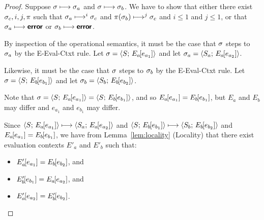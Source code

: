 \begin{proof}
  Suppose $\sigma \longmapsto \sigma_a$ and $\sigma \longmapsto \sigma_b$.
  We have to show that either there exist $\sigma_c, i, j, \pi$ such
  that $\sigma_a \longmapsto^i \sigma_c$ and $\pi(\sigma_b) \longmapsto^j
  \sigma_c$ and $i \leq 1$ and $j \leq 1$, or that $\sigma_a \longmapsto
  \textbf{\textsf{error}}$ or $\sigma_b \longmapsto \textbf{\textsf{error}}$.

  By inspection of the operational semantics, it must be the case that
  $\sigma$ steps to $\sigma_a$ by the {\sc E-Eval-Ctxt} rule.  Let
  $\sigma = \langle S;\, E_a\hspace{-1mm}\left[e_{a_1}\right] \rangle$ and let $\sigma_a =
  \langle S_a;\, E_a\hspace{-1mm}\left[e_{a_2}\right] \rangle$.

  Likewise, it must be the case that $\sigma$ steps to $\sigma_b$ by the
  {\sc E-Eval-Ctxt} rule.  Let $\sigma =
  \langle S;\, E_b\hspace{-1mm}\left[e_{b_1}\right] \rangle$ and let $\sigma_b =
  \langle S_b;\, E_b\hspace{-1mm}\left[e_{b_2}\right] \rangle$.

  Note that $\sigma = \langle S;\, E_a\hspace{-1mm}\left[e_{a_1}\right] \rangle =
  \langle S;\, E_b\hspace{-1mm}\left[e_{b_1}\right] \rangle$, and so
  $E_a\hspace{-1mm}\left[e_{a_1}\right] = E_b\hspace{-1mm}\left[e_{b_1}\right]$, but $E_a$ and
  $E_b$ may differ and $e_{a_1}$ and $e_{b_1}$ may differ.

  Since $\langle S;\, E_a\hspace{-1mm}\left[e_{a_1}\right] \rangle \longmapsto
  \langle S_a;\, E_a\hspace{-1mm}\left[e_{a_2}\right] \rangle$ and
  $\langle S;\, E_b\hspace{-1mm}\left[e_{b_1}\right] \rangle \longmapsto
  \langle S_b;\, E_b\hspace{-1mm}\left[e_{b_2}\right] \rangle$ and $E_a\hspace{-1mm}\left[e_{a_1}\right]
  = E_b\hspace{-1mm}\left[e_{b_1}\right]$, we have from Lemma~\ref{lem:locality}
  (Locality) that there exist evaluation contexts $E'_a$ and $E'_b$
  such that:

  \begin{itemize}
  \item $E'_a\hspace{-1mm}\left[e_{a_1}\right] = E_b\hspace{-1mm}\left[e_{b_2}\right]$, and
  \item $E'_b\hspace{-1mm}\left[e_{b_1}\right] = E_a\hspace{-1mm}\left[e_{a_2}\right]$, and
  \item $E'_a\hspace{-1mm}\left[e_{a_2}\right] =
  E'_b\hspace{-1mm}\left[e_{b_2}\right]$.
  \end{itemize}


\end{proof}
